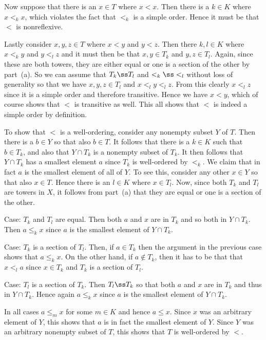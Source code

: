 {{    Now suppose that there is an $x \in T$ where $x < x$.
    Then there is a $k \in K$ where $x <_k x$, which violates the fact that $<_k$ is a simple order.
    Hence it must be that $<$ is nonreflexive.

    Lastly consider $x,y,z \in T$ where $x < y$ and $y < z$.
    Then there $k,l \in K$ where $x <_k y$ and $y <_l z$ and it must then be that $x,y \in T_k$ and $y,z \in T_l$.
    Again, since these are both towers, they are either equal or one is a section of the other by part~(a).
    So we can assume that $T_k \ss T_l$ and $<_k \ss <_l$ without loss of generality so that we have $x,y,z \in T_l$ and $x <_l y <_l z$.
    From this clearly $x <_l z$ since it is a simple order and therefore transitive.
    Hence we have $x < y$, which of course shows that $<$ is transitive as well.
    This all shows that $<$ is indeed a simple order by definition.

    To show that $<$ is a well-ordering, consider any nonempty subset $Y$ of $T$.
    Then there is a $b \in Y$ so that also $b \in T$.
    It follows that there is a $k \in K$ such that $b \in T_k$, and also that $Y \cap T_k$ is a nonempty subset of $T_k$.
    It then follows that $Y \cap T_k$ has a smallest element $a$ since $T_k$ is well-ordered by $<_k$.
    We claim that in fact $a$ is the smallest element of all of $Y$.
    To see this, consider any other $x \in Y$ so that also $x \in T$.
    Hence there is an $l \in K$ where $x \in T_l$.
    Now, since both $T_k$ and $T_l$ are towers in $X$, it follows from part~(a) that they are equal or one is a section of the other.

    Case: $T_k$ and $T_l$ are equal.
    Then both $a$ and $x$ are in $T_k$ and so both in $Y \cap T_k$.
    Then $a \leq_k x$ since $a$ is the smallest element of $Y \cap T_k$.

    Case: $T_k$ is a section of $T_l$.
    Then, if $a \in T_k$ then the argument in the previous case shows that $a \leq_k x$.
    On the other hand, if $a \notin T_k$, then it has to be that that $x <_l a$ since $x \in T_k$ and $T_k$ is a section of $T_l$.

    Case: $T_l$ is a section of $T_k$.
    Then $T_l \ss T_k$ so that both $a$ and $x$ are in $T_k$ and thus in $Y \cap T_k$.
    Hence again $a \leq_k x$ since $a$ is the smallest element of $Y \cap T_k$.

    In all cases $a \leq_m x$ for some $m \in K$ and hence $a \leq x$.
    Since $x$ was an arbitrary element of $Y$, this shows that $a$ is in fact the smallest element of $Y$.
    Since $Y$ was an arbitrary nonempty subset of $T$, this shows that $T$ is well-ordered by $<$.

}}
